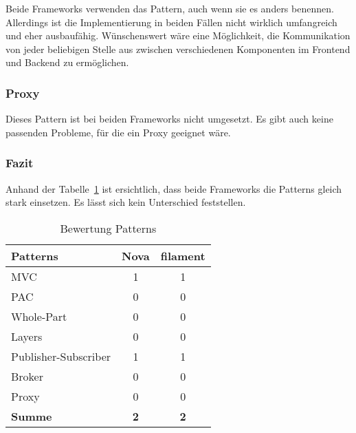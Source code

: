 Beide Frameworks verwenden das Pattern, auch wenn sie es anders benennen.
Allerdings ist die Implementierung in beiden Fällen nicht wirklich umfangreich und eher ausbaufähig.
Wünschenswert wäre eine Möglichkeit, die Kommunikation von jeder beliebigen Stelle aus zwischen verschiedenen Komponenten im Frontend und Backend zu ermöglichen.

\subsubsection{Proxy}
Dieses Pattern ist bei beiden Frameworks nicht umgesetzt.
Es gibt auch keine passenden Probleme, für die ein Proxy geeignet wäre.

\subsubsection{Fazit}
Anhand der Tabelle~\ref{tab:bewertung-patterns} ist ersichtlich, dass beide Frameworks die Patterns gleich stark einsetzen.
Es lässt sich kein Unterschied feststellen.

\begin{table}[h!]
    \caption{Bewertung Patterns}
    \label{tab:bewertung-patterns}
    \centering
    \begin{tabular}{|l|c|c|}
        \hline
        \textbf{Patterns}    & \textbf{Nova} & \textbf{filament} \\ \hline
        MVC                  & 1             & 1                 \\ \hline
        PAC                  & 0             & 0                 \\ \hline
        Whole-Part           & 0             & 0                 \\ \hline
        Layers               & 0             & 0                 \\ \hline
        Publisher-Subscriber & 1             & 1                 \\ \hline
        Broker               & 0             & 0                 \\ \hline
        Proxy                & 0             & 0                 \\ \hline
        \textbf{Summe}       & \textbf{2}    & \textbf{2}        \\ \hline
    \end{tabular}
\end{table}
